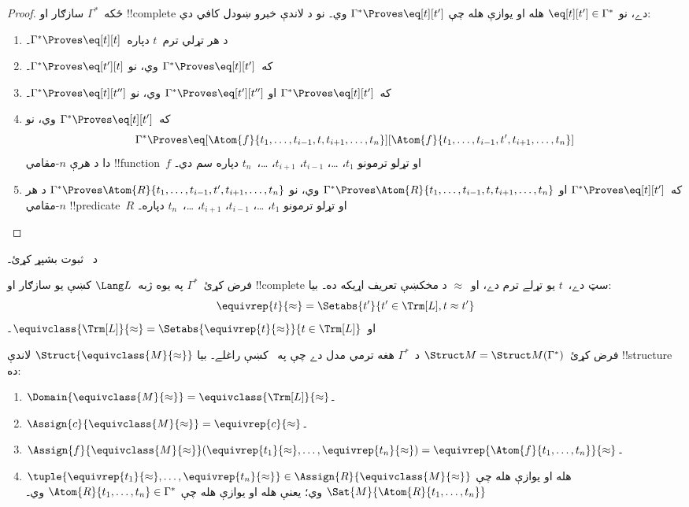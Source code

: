 \documentclass[../../../include/open-logic-section]{subfiles}
\begin{document}
\begin{proof}
ځکه~$\Gamma^*$ سازګار او !!{complete} دے، نو
$\eq[t][t'] \in \Gamma^*$ هله او يوازې هله چې
$\Gamma^* \Proves \eq[t][t']$ وي۔ نو د لاندې خبرو ښودل کافي دي:
\begin{enumerate}
\item د هر تړلي ترم~$t$ دپاره~$\Gamma^* \Proves \eq[t][t]$۔
\item که~$\Gamma^* \Proves \eq[t][t']$ وي، نو
  $\Gamma^* \Proves \eq[t'][t]$۔
\item که~$\Gamma^* \Proves \eq[t][t']$ او
  $\Gamma^* \Proves \eq[t'][t'']$ وي، نو
  $\Gamma^* \Proves \eq[t][t'']$۔
\item که~$\Gamma^* \Proves \eq[t][t']$ وي، نو
\[
\Gamma^* \Proves
\eq[\Atom{f}{t_1,\dots,t_{i-1},t,t_{i+1},\dots,t_n}][\Atom{f}{t_1,\dots,t_{i-1},t',t_{i+1},\dots,t_n}]
\]
دا د هرې
$n$-مقامي !!{function}~$f$ او تړلو ترمونو $t_1$، \dots،
$t_{i-1}$، $t_{i+1}$، \dots،~$t_n$ دپاره سم دي۔
\item که~$\Gamma^* \Proves \eq[t][t']$ او
$\Gamma^* \Proves
\Atom{R}{t_1,\dots,t_{i-1},t,t_{i+1},\dots,t_n}$ وي، نو
$\Gamma^* \Proves \Atom{R}{t_1,\dots,t_{i-1},t',t_{i+1},\dots,t_n}$
د هر $n$-مقامي !!{predicate}~$R$ او تړلو ترمونو $t_1$، \dots،
$t_{i-1}$، $t_{i+1}$، \dots،~$t_n$ دپاره۔
\end{enumerate}
\end{proof}

\begin{prob}
د~ ثبوت بشپړ کړئ۔
\end{prob}

\begin{defn}
فرض کړئ~$\Gamma^*$ په يوه ژبه~$\Lang L$ کښې يو سازګار او
!!{complete} سټ دے،~$t$ يو تړلے ترم دے، او~$\approx$ د مخکښې
تعريف اړيکه ده۔ بيا:
\[
\equivrep{t}{\approx} = \Setabs{t'}{t'\in \Trm[L], t \approx t'}
\]
او~$\equivclass{\Trm[L]}{\approx} = \Setabs{\equivrep{t}{\approx}}{t \in \Trm[L]}$۔
\end{defn}

\begin{defn}
فرض کړئ~$\Struct M = \Struct M(\Gamma^*)$ د~$\Gamma^*$ هغه ترمي
مدل دے چې په~ کښې راغلے۔ بيا
$\Struct{\equivclass{M}{\approx}}$ لاندې !!{structure} ده:
\begin{enumerate}
\item $\Domain{\equivclass{M}{\approx}} = \equivclass{\Trm[L]}{\approx}$۔
\item $\Assign{c}{\equivclass{M}{\approx}} = \equivrep{c}{\approx}$۔
\item $\Assign{f}{\equivclass{M}{\approx}}(\equivrep{t_1}{\approx}, \dots,
  \equivrep{t_n}{\approx}) = \equivrep{\Atom{f}{t_1,\dots, t_n}}{\approx}$۔
\item $\tuple{\equivrep{t_1}{\approx}, \dots, \equivrep{t_n}{\approx}} \in
  \Assign{R}{\equivclass{M}{\approx}}$ هله او يوازې هله چې
  $\Sat{M}{\Atom{R}{t_1,\dots, t_n}}$ وي؛ يعنې هله او يوازې هله چې
  $\Atom{R}{t_1,\dots, t_n} \in \Gamma^*$ وي۔
\end{enumerate}
\end{defn}
\end{document}
